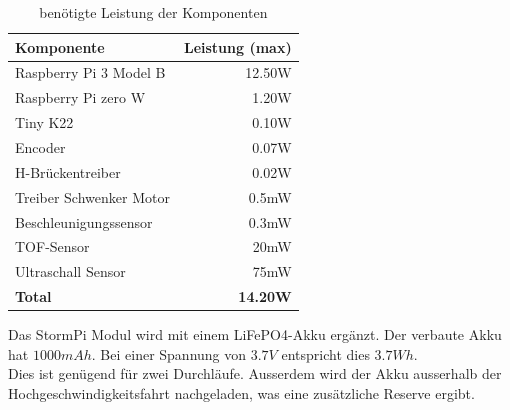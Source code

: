 \documentclass[../../main.tex]{subfiles}
\begin{document}
    \begin{table}[H] \centering
        \begin{tabular}{|l|r|}
        \hline
        \textbf{Komponente}     & \textbf{Leistung (max)} \\ \hline
        Raspberry Pi 3 Model B  & 12.50W \nocite{PiShopPi3ModelBp}                 \\ \hline
        Raspberry Pi zero W     & 1.20W \nocite{RaspiTvPiZeroPower}                   \\ \hline
        Tiny K22                & 0.10W \nocite{K22DataSheet}       \\ \hline
        Encoder                 & 0.07W                   \\ \hline
        H-Brückentreiber        & 0.02W                   \\ \hline
        Treiber Schwenker Motor & 0.5mW                   \\ \hline
        Beschleunigungssensor   & 0.3mW                   \\ \hline
        TOF-Sensor              & 20mW                    \\ \hline
        Ultraschall Sensor      & 75mW                    \\ \hline
        \textbf{Total}          & \textbf{14.20W}         \\ \hline
        \end{tabular}
        \caption{benötigte Leistung der Komponenten}
        \label{tab:et_komponente_leistung}
    \end{table}

    Das StormPi Modul wird mit einem LiFePO4-Akku ergänzt. Der verbaute Akku hat $1000mAh$. Bei einer Spannung von $3.7V$ entspricht dies $3.7Wh$. \\
    Dies ist genügend für zwei Durchläufe. Ausserdem wird der Akku ausserhalb der Hochgeschwindigkeitsfahrt nachgeladen, was eine zusätzliche Reserve ergibt.
\end{document}
